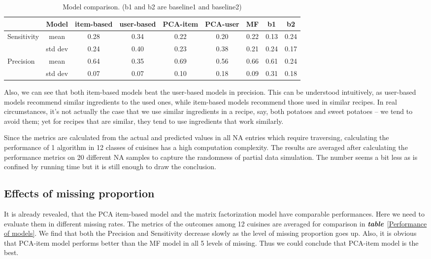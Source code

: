 \documentclass{article}
\begin{document}
\begin{table}[htb]
\centering
\vskip -5mm
\begin{center}
\begin{tabular}{lcccccccc}
\hline

&Model& item-based & user-based & PCA-item & PCA-user & MF & b1 &b2\\
\hline
Sensitivity&mean & 0.28 & 0.34 & 0.22 & 0.20 & 0.22 & 0.13 & 0.24
\\
&std dev & 0.24 & 0.40 & 0.23 & 0.38 & 0.21 & 0.24 &	0.17\\
\hline
Precision&mean &0.64&0.35&0.69&0.56&0.66&0.61&0.24

\\
&std dev &0.07 &0.07 &0.10 &0.18 &0.09 &0.31 &0.18 
\\
\hline
\end{tabular}
\vskip 1mm
\caption{Model comparison. (b1 and b2 are baseline1 and baseline2)}
\label{Model comparison}
\end{center}
\vskip -8mm
\end{table}

Also, we can see that both item-based models beat the user-based models in precision. This can be understood intuitively, as user-based models recommend similar ingredients to the used ones, while item-based models recommend those used in similar recipes. In real circumstances, it’s not actually the case that we use similar ingredients in a recipe, say, both potatoes and sweet potatoes – we tend to avoid them; yet for recipes that are similar, they tend to use ingredients that work similarly.

Since the metrics are calculated from the actual and predicted values in all NA entries which require traversing, calculating the performance of 1 algorithm in 12 classes of cuisines has a high computation complexity. The results are averaged after calculating the performance metrics on 20 different NA samples to capture the randomness of partial data simulation. The number seems a bit less as is confined by running time but it is still enough to draw the conclusion.

\subsection{Effects of missing proportion}
It is already revealed, that the PCA item-based model and the matrix factorization model have comparable performances. Here we need to evaluate them in different missing rates. The metrics of the outcomes among 12 cuisines are averaged for comparison in \emph{\textbf{table}}~\ref{Performance of models}. We find that both the Precision and Sensitivity decrease slowly as the level of missing proportion goes up. Also, it is obvious that PCA-item model performs better than the MF model in all 5 levels of missing. Thus we could conclude that PCA-item model is the best.
\end{document}
